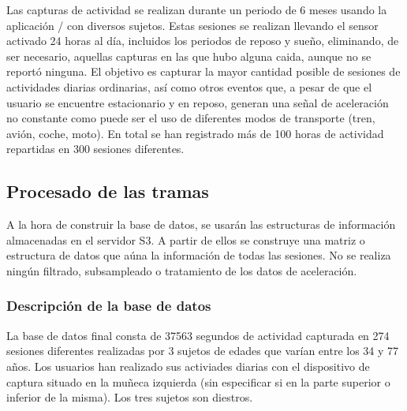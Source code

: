 Las capturas de actividad se realizan durante un periodo de 6 meses usando la aplicación \accelcapture/ con diversos sujetos. Estas sesiones se realizan llevando el sensor activado 24 horas al día, incluidos los periodos de reposo y sueño, eliminando, de ser necesario, aquellas capturas en las que hubo alguna caida, aunque no se reportó ninguna. El objetivo es capturar la mayor cantidad posible de sesiones de actividades diarias ordinarias, así como otros eventos que, a pesar de que el usuario se encuentre estacionario y en reposo, generan una señal de aceleración no constante como puede ser el uso de diferentes modos de transporte (tren, avión, coche, moto). En total se han registrado más de 100 horas de actividad repartidas en 300 sesiones diferentes.

\subsection{Procesado de las tramas}

A la hora de construir la base de datos, se usarán las estructuras de información almacenadas en el servidor S3. A partir de ellos se construye una matriz o estructura de datos que aúna la información de todas las sesiones. No se realiza ningún filtrado, subsampleado o tratamiento de los datos de aceleración.

\subsubsection{Descripción de la base de datos}

La base de datos final consta de 37563 segundos de actividad capturada en 274 sesiones diferentes realizadas por 3 sujetos de edades que varían entre los 34 y 77 años. Los usuarios han realizado sus activiades diarias con el dispositivo de captura situado en la muñeca izquierda (sin especificar si en la parte superior o inferior de la misma). Los tres sujetos son diestros.



